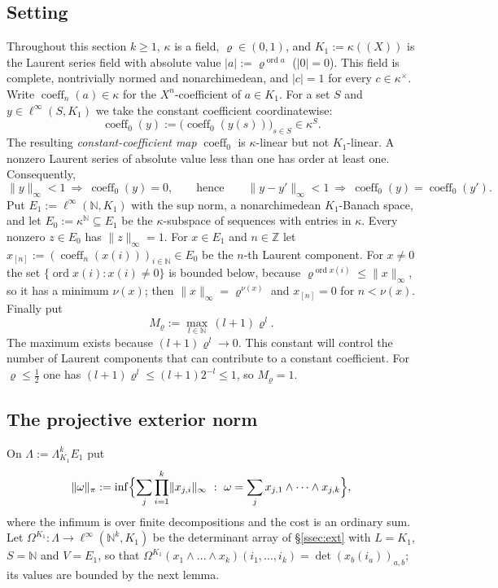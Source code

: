 \documentclass[11pt]{amsart}
\theoremstyle{definition}
\theoremstyle{remark}
\numberwithin{equation}{section}
\newcommand{\N}{\mathbb N}
\newcommand{\Z}{\mathbb Z}
\newcommand{\linf}{\ell^\infty}
\newcommand{\abs}[1]{\lvert #1\rvert}
\newcommand{\norm}[1]{\lVert #1\rVert}
\newcommand{\coeff}{\operatorname{coeff}}
\newcommand{\ord}{\operatorname{ord}}
\theoremstyle{plain}
\theoremstyle{definition}
\theoremstyle{plain}
\begin{document}
\subsection{Setting}\label{ssec:laurentsetting}
Throughout this section $k\ge1$, $\kappa$ is a field, $\varrho\in(0,1)$, and $K_1:=\kappa((X))$ is the Laurent series field with
absolute value $\abs a:=\varrho^{\ord a}$ ($\abs0=0$). This field is complete, nontrivially normed and nonarchimedean, and
$\abs c=1$ for every $c\in\kappa^\times$. Write $\coeff_n(a)\in\kappa$ for the $X^n$\nobreakdash-coefficient of $a\in K_1$.
For a set $S$ and $y\in\linf(S,K_1)$ we take the constant coefficient coordinatewise:
\[
\coeff_0(y):=\bigl(\coeff_0(y(s))\bigr)_{s\in S}\in\kappa^S.
\]
The resulting \emph{constant-coefficient map} $\coeff_0$ is $\kappa$\nobreakdash-linear but not $K_1$\nobreakdash-linear.
A nonzero Laurent series of absolute value less than one has order at least one. Consequently,
\begin{equation}\label{eq:small}
\norm y_\infty<1\ \Longrightarrow\ \coeff_0(y)=0,\qquad\text{hence}\qquad \norm{y-y'}_\infty<1\ \Longrightarrow\ \coeff_0(y)=\coeff_0(y').
\end{equation}
Put $E_1:=\linf(\N,K_1)$ with the sup norm, a nonarchimedean $K_1$\nobreakdash-Banach space, and let $E_0:=\kappa^\N\subseteq E_1$ be
the $\kappa$\nobreakdash-subspace of sequences with entries in $\kappa$. Every nonzero $z\in E_0$ has $\norm z_\infty=1$. For
$x\in E_1$ and $n\in\Z$ let $x_{[n]}:=(\coeff_n(x(i)))_{i\in\N}\in E_0$ be the $n$\nobreakdash-th Laurent component. For $x\ne0$
the set $\{\ord x(i):x(i)\ne0\}$ is bounded below, because $\varrho^{\ord x(i)}\le\norm x_\infty$, so it has a minimum
$\nu(x)$; then $\norm x_\infty=\varrho^{\nu(x)}$ and $x_{[n]}=0$ for $n<\nu(x)$. Finally put
\[
M_\varrho:=\max_{l\in\N}\,(l+1)\varrho^l .
\]
The maximum exists because $(l+1)\varrho^l\to0$. This constant will control the number of Laurent components that can
contribute to a constant coefficient. For $\varrho\le\frac12$ one has $(l+1)\varrho^l\le(l+1)2^{-l}\le1$, so $M_\varrho=1$.

\subsection{The projective exterior norm}\label{ssec:projnorm}
On $\Lambda:=\Lambda^k_{K_1}E_1$ put
\[
\norm\omega_\pi:=\inf\Bigl\{\sum_j\prod_{i=1}^k\norm{x_{j,i}}_\infty\ :\ \omega=\sum_jx_{j,1}\wedge\dots\wedge x_{j,k}\Bigr\},
\]
where the infimum is over finite decompositions and the cost is an ordinary sum. Let $\Omega^{K_1}\colon\Lambda\to\linf(\N^k,K_1)$ be the determinant
array of \S\ref{ssec:ext} with $L=K_1$, $S=\N$ and $V=E_1$, so that
$\Omega^{K_1}(x_1\wedge\dots\wedge x_k)(i_1,\dots,i_k)=\det(x_b(i_a))_{a,b}$; its values are bounded by the next lemma.
\end{document}
